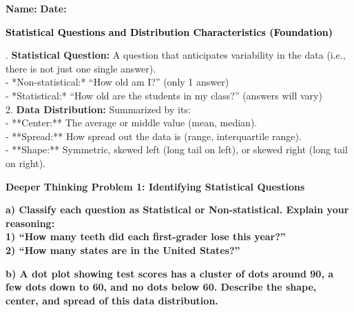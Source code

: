 \documentclass[12pt, letterpaper, fleqn]{article}
\begin{document}
\textbf{Name:} \underline{\hspace{5cm}}
\hfill
\textbf{Date:} \underline{\hspace{3cm}}\\

\begin{tcolorbox}[colback=customteal!20]
    \large\textcolor{black}{\textbf{Statistical Questions and Distribution Characteristics (Foundation)}}
\end{tcolorbox}

\vspace{3mm}

. \textbf{Statistical Question:} A question that anticipates variability in the data (i.e., there is not just one single answer). \\
- *Non-statistical:* ``How old am I?'' (only 1 answer) \\
- *Statistical:* ``How old are the students in my class?'' (answers will vary) \\
2. \textbf{Data Distribution:} Summarized by its: \\
- **Center:** The average or middle value (mean, median). \\
- **Spread:** How spread out the data is (range, interquartile range). \\
- **Shape:** Symmetric, skewed left (long tail on left), or skewed right (long tail on right).

\vspace{4mm}

\begin{tcolorbox}[colback=yellow!15, colframe=orange, boxrule=1.5pt, arc=4mm, left=6mm, right=6mm, top=5mm, bottom=5mm]
\textbf{Deeper Thinking Problem 1: Identifying Statistical Questions}

\medskip

\noindent
\textbf{a) Classify each question as Statistical or Non-statistical. Explain your reasoning: \\
1) ``How many teeth did each first-grader lose this year?'' \\
2) ``How many states are in the United States?''}

\vspace{2cm}

\noindent
\textbf{b) A dot plot showing test scores has a cluster of dots around 90, a few dots down to 60, and no dots below 60. Describe the shape, center, and spread of this data distribution.}

\vspace{2cm}
\end{tcolorbox}
\newpage
\end{document}
